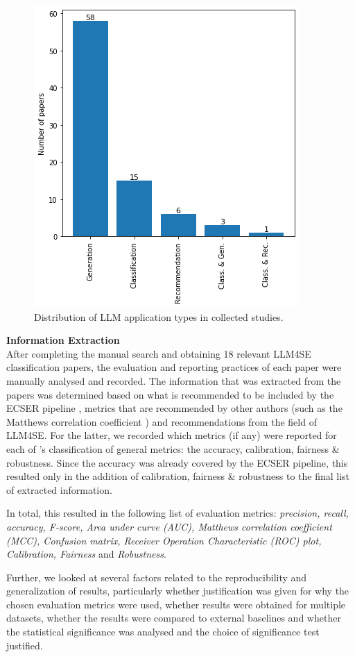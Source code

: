 \documentclass[a4paper]{article}
\begin{document}
\begin{figure}[h]
	\centering
	\captionsetup{justification=centering}
	\includegraphics[width=0.5\linewidth]{figures/LLMTypes.png}
	\caption{Distribution of LLM application types in collected studies.}
	\label{fig:LLMTypes}
\end{figure}



\textbf{Information Extraction}\\
After completing the manual search and obtaining 18 relevant LLM4SE classification papers, the evaluation and reporting practices of each paper were manually analysed and recorded. The information that was extracted from the papers was determined based on what is recommended to be included by the ECSER pipeline \cite{Dellanna2022}, metrics that are recommended by other authors (such as the Matthews correlation coefficient \cite{Chicco2020,Foody2023,Yao2020}) and recommendations from the field of LLM4SE. For the latter, we recorded which metrics (if any) were reported for each of \textcite{chang2023}'s classification of general metrics: the accuracy, calibration, fairness \& robustness. Since the accuracy was already covered by the ECSER pipeline, this resulted only in the addition of calibration, fairness \& robustness to the final list of extracted information.

In total, this resulted in the following list of evaluation metrics: \textit{precision, recall, accuracy, F-score, Area under curve (AUC), Matthews correlation coefficient (MCC), Confusion matrix, Receiver Operation Characteristic (ROC) plot, Calibration, Fairness} and \textit{Robustness}.

Further, we looked at several factors related to the reproducibility and generalization of results, particularly whether justification was given for why the chosen evaluation metrics were used, whether results were obtained for multiple datasets, whether the results were compared to external baselines and whether the statistical significance was analysed and the choice of significance test justified. 
\end{document}
